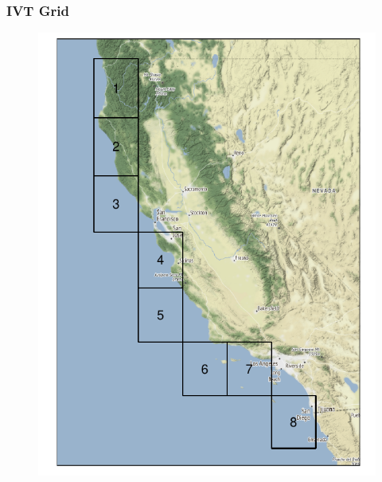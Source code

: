 \documentclass[aspectratio=169,10pt,notes]{beamer}
\newlength{\frametextheight}
\begin{document}
\begin{frame}
    \frametitle{IVT Grid}
    \begin{figure}[h]
        \begin{minipage}{.49\textwidth}
            \centering
            \includegraphics[height=\frametextheight]{./ch1/images/erai_grid}
        \end{minipage}
        \begin{minipage}{.49\textwidth}
            \centering

\end{minipage}
\end{figure}
\end{frame}
\end{document}
